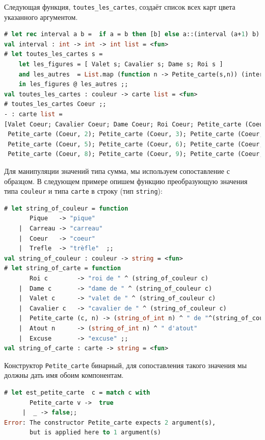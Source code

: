 Следующая функция, \texttt{toutes\_les\_cartes}, создаёт список всех карт цвета
указанного аргументом.

\begin{lstlisting}[language=OCaml]
# let rec interval a b =  if a = b then [b] else a::(interval (a+1) b) ;;
val interval : int -> int -> int list = <fun>
# let toutes_les_cartes s =
    let les_figures = [ Valet s; Cavalier s; Dame s; Roi s ]
    and les_autres  = List.map (function n -> Petite_carte(s,n)) (interval 1 10)
    in les_figures @ les_autres ;;
val toutes_les_cartes : couleur -> carte list = <fun>
# toutes_les_cartes Coeur ;;
- : carte list =
[Valet Coeur; Cavalier Coeur; Dame Coeur; Roi Coeur; Petite_carte (Coeur, 1);
 Petite_carte (Coeur, 2); Petite_carte (Coeur, 3); Petite_carte (Coeur, 4);
 Petite_carte (Coeur, 5); Petite_carte (Coeur, 6); Petite_carte (Coeur, 7);
 Petite_carte (Coeur, 8); Petite_carte (Coeur, 9); Petite_carte (Coeur, 10)]
\end{lstlisting}

Для манипуляции значений типа сумма, мы используем сопоставление с образцом. В
следующем примере опишем функцию преобразующую значения типа \texttt{couleur} и
типа \texttt{carte} в строку (тип \texttt{string}):

\begin{lstlisting}[language=OCaml]
# let string_of_couleur = function
       Pique   -> "pique"
    |  Carreau -> "carreau"
    |  Coeur   -> "coeur"
    |  Trefle  -> "trèfle"  ;;
val string_of_couleur : couleur -> string = <fun>
# let string_of_carte = function
       Roi c        -> "roi de " ^ (string_of_couleur c)
    |  Dame c       -> "dame de " ^ (string_of_couleur c)
    |  Valet c      -> "valet de " ^ (string_of_couleur c)
    |  Cavalier c   -> "cavalier de " ^ (string_of_couleur c)
    |  Petite_carte (c, n) -> (string_of_int n) ^ " de "^(string_of_couleur c)
    |  Atout n      -> (string_of_int n) ^ " d'atout"
    |  Excuse       -> "excuse" ;;
val string_of_carte : carte -> string = <fun>
\end{lstlisting}

Конструктор \texttt{Petite\_carte} бинарный, для сопоставления такого значения
мы должны дать имя обоим компонентам.

\begin{lstlisting}[language=OCaml]
# let est_petite_carte  c = match c with
       Petite_carte v ->  true
     |  _ -> false;;
Error: The constructor Petite_carte expects 2 argument(s),
       but is applied here to 1 argument(s)
\end{lstlisting}


